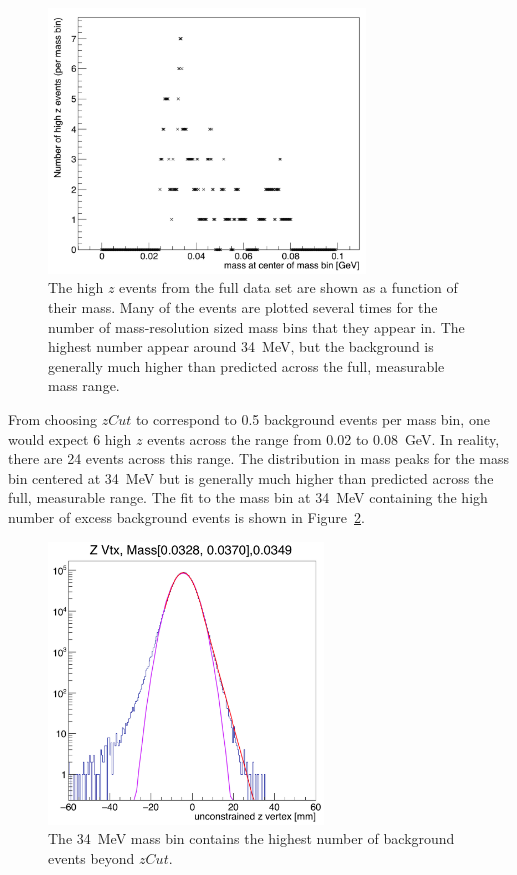 \begin{figure}[htb]
  \centering
      \includegraphics[width=0.75\textwidth]{pics/results/highz_v_mass.png}
  \caption[High $z$ events as a function of mass]{The high $z$ events from the full data set are shown as a function of their mass. Many of the events are plotted several times for the number of mass-resolution sized mass bins that they appear in. The highest number appear around 34~MeV, but the background is generally much higher than predicted across the full, measurable mass range.}
  \label{fig:highz_mass}
\end{figure} 
From choosing $zCut$ to correspond to 0.5 background events per mass bin, one would expect 6 high $z$ events across the range from 0.02 to 0.08~GeV. In reality, there are 24 events across this range. The distribution in mass peaks for the mass bin centered at 34~MeV but is generally much higher than predicted across the full, measurable range. The fit to the mass bin at 34~MeV containing the high number of excess background events is shown in Figure~\ref{fig:highz_34mev}.\\
\begin{figure}[htb]
  \centering
      \includegraphics[width=0.65\textwidth]{pics/results/zvtx_34MeV.png}
  \caption[Vertex distribution for 34~MeV mass bin with high $z$ background]{The 34~MeV mass bin contains the highest number of background events beyond $zCut$.}
  \label{fig:highz_34mev}
\end{figure} 
